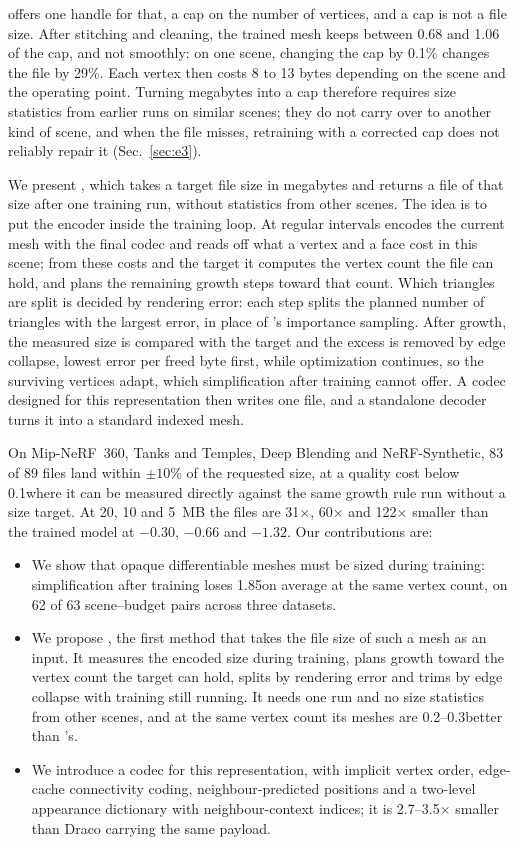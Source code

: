 \MS offers one handle for that, a cap on the number of vertices, and a cap is not a file size. After stitching and cleaning, the trained mesh keeps between 0.68 and 1.06 of the cap, and not smoothly: on one scene, changing the cap by 0.1\% changes the file by 29\%. Each vertex then costs 8 to 13 bytes depending on the scene and the operating point. Turning megabytes into a cap therefore requires size statistics from earlier runs on similar scenes; they do not carry over to another kind of scene, and when the file misses, retraining with a corrected cap does not reliably repair it (Sec.~\ref{sec:e3}).

We present \BM, which takes a target file size in megabytes and returns a file of that size after one training run, without statistics from other scenes. The idea is to put the encoder inside the training loop. At regular intervals \BM encodes the current mesh with the final codec and reads off what a vertex and a face cost in this scene; from these costs and the target it computes the vertex count the file can hold, and plans the remaining growth steps toward that count. Which triangles are split is decided by rendering error: each step splits the planned number of triangles with the largest error, in place of \MS's importance sampling. After growth, the measured size is compared with the target and the excess is removed by edge collapse, lowest error per freed byte first, while optimization continues, so the surviving vertices adapt, which simplification after training cannot offer. A codec designed for this representation then writes one file, and a standalone decoder turns it into a standard indexed mesh.

On Mip-NeRF~360, Tanks and Temples, Deep Blending and NeRF-Synthetic, 83 of 89 files land within $\pm10\%$ of the requested size, at a quality cost below 0.1\dB where it can be measured directly against the same growth rule run without a size target. At 20, 10 and 5~MB the files are 31$\times$, 60$\times$ and 122$\times$ smaller than the trained model at $-0.30$, $-0.66$ and $-1.32$\dB. Our contributions are:
\begin{itemize}\setlength\itemsep{1pt}
\item We show that opaque differentiable meshes must be sized during training: simplification after training loses 1.85\dB on average at the same vertex count, on 62 of 63 scene--budget pairs across three datasets.
\item We propose \BM, the first method that takes the file size of such a mesh as an input. It measures the encoded size during training, plans growth toward the vertex count the target can hold, splits by rendering error and trims by edge collapse with training still running. It needs one run and no size statistics from other scenes, and at the same vertex count its meshes are 0.2--0.3\dB better than \MS's.
\item We introduce a codec for this representation, with implicit vertex order, edge-cache connectivity coding, neighbour-predicted positions and a two-level appearance dictionary with neighbour-context indices; it is 2.7--3.5$\times$ smaller than Draco carrying the same payload.
\end{itemize}
